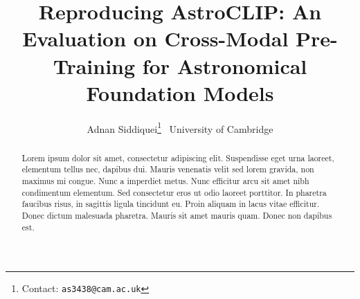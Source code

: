 \documentclass{article} %
\title{Reproducing AstroCLIP: An Evaluation on Cross-Modal Pre-Training for Astronomical Foundation Models}
\author{Adnan Siddiquei\thanks{Contact: \texttt{as3438@cam.ac.uk}}$\;^{\:}$
   \vspace{15pt}
   \AND
    \textnormal{University of Cambridge} \vspace{10pt}
   \AND
 \vspace{10pt}
}
\begin{document}
    \maketitle

    \begin{abstract}
    Lorem ipsum dolor sit amet, consectetur adipiscing elit. Suspendisse eget urna laoreet, elementum tellus nec, dapibus dui.
    Mauris venenatis velit sed lorem gravida, non maximus mi congue. Nunc a imperdiet metus. Nunc efficitur arcu sit amet nibh
    condimentum elementum. Sed consectetur eros ut odio laoreet porttitor. In pharetra faucibus risus, in sagittis ligula
    tincidunt eu. Proin aliquam in lacus vitae efficitur. Donec dictum malesuada pharetra. Mauris sit amet mauris quam.
    Donec non dapibus est.
    \end{abstract}

    
    
    
    

    \nocite{*}
    
    
    \clearpage
\end{document}
